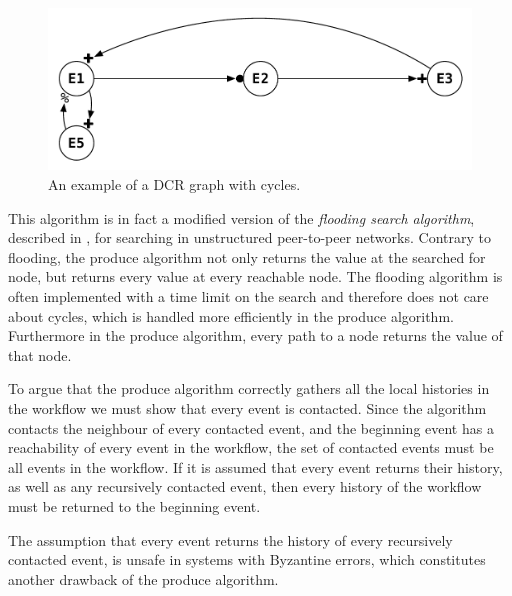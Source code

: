 	\begin{figure}[H]
		\centering
		\includegraphics[height=0.15\textheight]{4connect/images/dcr-graph-cycle.pdf}
		\caption{An example of a DCR graph with cycles.}
		\label{fig:connecting:dcr-graph-cycle}
	\end{figure}
		
	\newpar This algorithm is in fact a modified version of the \textit{flooding search algorithm}, described in \cite{Coulouris:2011:DSC:2029110:chapter6}, for searching in unstructured peer-to-peer networks. Contrary to flooding, the produce algorithm not only returns the value at the searched for node, but returns every value at every reachable node. The flooding algorithm is often implemented with a time limit on the search and therefore does not care about cycles, which is handled more efficiently in the produce algorithm. Furthermore in the produce algorithm, every path to a node returns the value of that node.
	
	\newpar To argue that the produce algorithm correctly gathers all the local histories in the workflow we must show that every event is contacted. Since the algorithm contacts the neighbour of every contacted event, and the beginning event has a reachability of every event in the workflow, the set of contacted events must be all events in the workflow. If it is assumed that every event returns their history, as well as any recursively contacted event, then every history of the workflow must be returned to the beginning event. 
	
	The assumption that every event returns the history of every recursively contacted event, is unsafe in systems with Byzantine errors, which constitutes another drawback of the produce algorithm.
	
